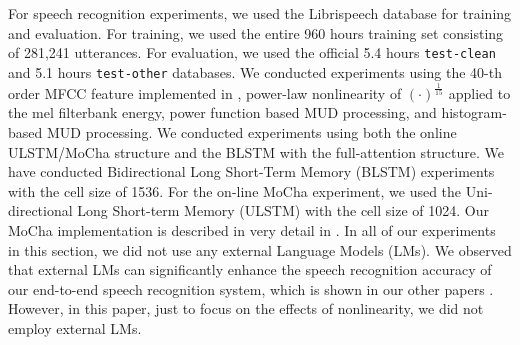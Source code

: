 \documentclass[a4paper]{article}
\begin{document}
%

\label{sec:experimental_results}
%
For speech recognition experiments, we used the Librispeech database
\cite{v_panayotov_icassp_2015_00}
for training and evaluation. For training, we used the entire 960 hours training
set consisting of 281,241 utterances. For evaluation, we used the 
official 5.4 hours {\tt test-clean} and 5.1 hours {\tt test-other} databases.
We conducted experiments
using the 40-th order MFCC feature implemented in
\cite{b_mcfee_proc_scipy_2015_00}, power-law nonlinearity of
$(\cdot)^{\frac{1}{15}}$ applied to the mel filterbank energy, 
power function based MUD processing, and histogram-based MUD processing.
We conducted experiments using both the online ULSTM/MoCha 
\cite{c_chiu_iclr_2018_00} structure and the BLSTM with the full-attention 
structure. We have conducted Bidirectional Long Short-Term Memory (BLSTM) 
experiments with the cell size of 1536.
For the on-line MoCha experiment, we used the Uni-directional 
Long Short-term Memory (ULSTM) with the cell size of 1024. 
Our MoCha implementation is described in very detail in \cite{k_kim_asru_2019_00}.
In all of our experiments in this section, we did not use any external Language 
Models (LMs). We observed that external LMs can significantly enhance the 
speech recognition accuracy of our end-to-end speech recognition system, which 
is shown in our other papers
\cite{c_kim_interspeech_2019_00, c_kim_asru_2019_01}. However, in this paper,
just to focus on the effects of nonlinearity, we did not employ external LMs.
\end{document}
